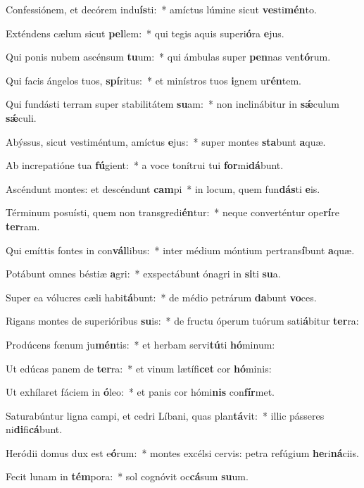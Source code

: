\item Confessiónem, et decórem indu\textbf{ís}ti:~* amíctus lúmine sicut \textbf{ves}ti\textbf{mén}to.
\item Exténdens cælum sicut \textbf{pel}lem:~* qui tegis aquis superi\textbf{ó}ra \textbf{e}jus.
\item Qui ponis nubem ascénsum \textbf{tu}um:~* qui ámbulas super \textbf{pen}nas ven\textbf{tó}rum.
\item Qui facis ángelos tuos, \textbf{spí}ritus:~* et minístros tuos \textbf{i}gnem u\textbf{rén}tem.
\item Qui fundásti terram super stabilitátem \textbf{su}am:~* non inclinábitur in \textbf{sǽ}culum \textbf{sǽ}culi.
\item Abýssus, sicut vestiméntum, amíctus \textbf{e}jus:~* super montes \textbf{sta}bunt \textbf{a}quæ.
\item Ab increpatióne tua \textbf{fú}gient:~* a voce tonítrui tui \textbf{for}mi\textbf{dá}bunt.
\item Ascéndunt montes: et descéndunt \textbf{cam}pi~* in locum, quem fun\textbf{dás}ti \textbf{e}is.
\item Términum posuísti, quem non transgredi\textbf{én}tur:~* neque converténtur ope\textbf{rí}re \textbf{ter}ram.
\item Qui emíttis fontes in con\textbf{vál}libus:~* inter médium móntium pertrans\textbf{í}bunt \textbf{a}quæ.
\item Potábunt omnes béstiæ \textbf{a}gri:~* exspectábunt ónagri in \textbf{si}ti \textbf{su}a.
\item Super ea vólucres cæli habi\textbf{tá}bunt:~* de médio petrárum \textbf{da}bunt \textbf{vo}ces.
\item Rigans montes de superióribus \textbf{su}is:~* de fructu óperum tuórum sati\textbf{á}bitur \textbf{ter}ra:
\item Prodúcens fœnum ju\textbf{mén}tis:~* et herbam servi\textbf{tú}ti \textbf{hó}minum:
\item Ut edúcas panem de \textbf{ter}ra:~* et vinum lætífi\textbf{cet} cor \textbf{hó}minis:
\item Ut exhílaret fáciem in \textbf{ó}leo:~* et panis cor hómi\textbf{nis} con\textbf{fír}met.
\item Saturabúntur ligna campi, et cedri Líbani, quas plan\textbf{tá}vit:~* illic pásseres ni\textbf{di}fi\textbf{cá}bunt.
\item Heródii domus dux est e\textbf{ó}rum:~* montes excélsi cervis: petra refúgium \textbf{he}ri\textbf{ná}ciis.
\item Fecit lunam in \textbf{tém}pora:~* sol cognóvit oc\textbf{cá}sum \textbf{su}um.
